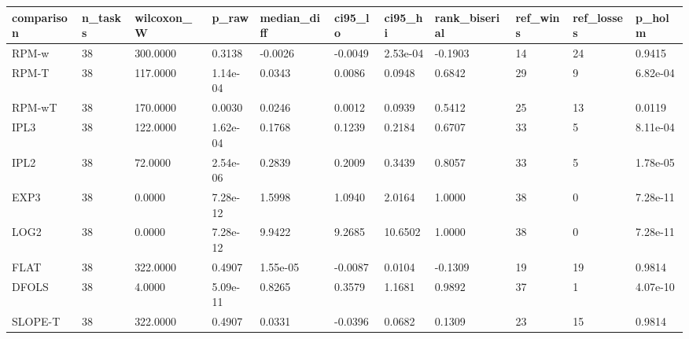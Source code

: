 \begin{tabular}{lllllllllll}
\hline
comparison & n\_tasks & wilcoxon\_W & p\_raw & median\_diff & ci95\_lo & ci95\_hi & rank\_biserial & ref\_wins & ref\_losses & p\_holm \\
\hline
RPM-w & 38 & 300.0000 & 0.3138 & -0.0026 & -0.0049 & 2.53e-04 & -0.1903 & 14 & 24 & 0.9415 \\
RPM-T & 38 & 117.0000 & 1.14e-04 & 0.0343 & 0.0086 & 0.0948 & 0.6842 & 29 & 9 & 6.82e-04 \\
RPM-wT & 38 & 170.0000 & 0.0030 & 0.0246 & 0.0012 & 0.0939 & 0.5412 & 25 & 13 & 0.0119 \\
IPL3 & 38 & 122.0000 & 1.62e-04 & 0.1768 & 0.1239 & 0.2184 & 0.6707 & 33 & 5 & 8.11e-04 \\
IPL2 & 38 & 72.0000 & 2.54e-06 & 0.2839 & 0.2009 & 0.3439 & 0.8057 & 33 & 5 & 1.78e-05 \\
EXP3 & 38 & 0.0000 & 7.28e-12 & 1.5998 & 1.0940 & 2.0164 & 1.0000 & 38 & 0 & 7.28e-11 \\
LOG2 & 38 & 0.0000 & 7.28e-12 & 9.9422 & 9.2685 & 10.6502 & 1.0000 & 38 & 0 & 7.28e-11 \\
FLAT & 38 & 322.0000 & 0.4907 & 1.55e-05 & -0.0087 & 0.0104 & -0.1309 & 19 & 19 & 0.9814 \\
DFOLS & 38 & 4.0000 & 5.09e-11 & 0.8265 & 0.3579 & 1.1681 & 0.9892 & 37 & 1 & 4.07e-10 \\
SLOPE-T & 38 & 322.0000 & 0.4907 & 0.0331 & -0.0396 & 0.0682 & 0.1309 & 23 & 15 & 0.9814 \\
\hline
\end{tabular}
